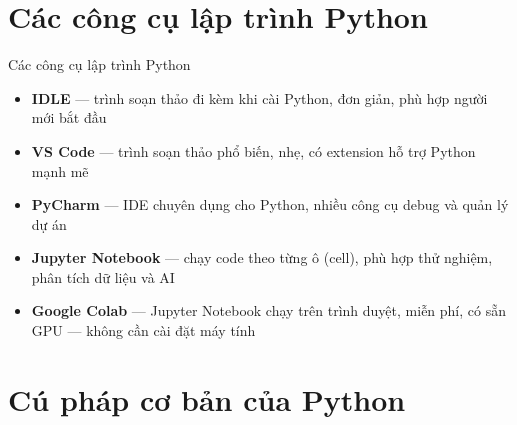 \documentclass[11pt]{beamer}
\begin{document}

\section{Các công cụ lập trình Python}

\begin{frame}{Các công cụ lập trình Python}
\begin{itemize}
  \item \textbf{IDLE} — trình soạn thảo đi kèm khi cài Python, đơn giản, phù hợp người mới bắt đầu
  \item \textbf{VS Code} — trình soạn thảo phổ biến, nhẹ, có extension hỗ trợ Python mạnh mẽ
  \item \textbf{PyCharm} — IDE chuyên dụng cho Python, nhiều công cụ debug và quản lý dự án
  \item \textbf{Jupyter Notebook} — chạy code theo từng ô (cell), phù hợp thử nghiệm, phân tích dữ liệu và AI
  \item \textbf{Google Colab} — Jupyter Notebook chạy trên trình duyệt, miễn phí, có sẵn GPU — không cần cài đặt máy tính
\end{itemize}
\end{frame}

\section{Cú pháp cơ bản của Python}
\end{document}
